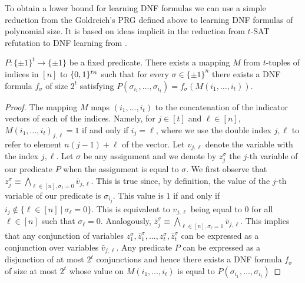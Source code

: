 To obtain a lower bound for learning DNF formulas we can use a simple reduction from the Goldreich's PRG defined above to learning DNF formulas of polynomial size. It is based on ideas implicit in the reduction from $t$-SAT refutation to DNF learning from \cite{DanielyS16}.
\begin{lemma}\label{lem:reduce-dnf}
$P: \{\pm 1\}^t \to \{\pm 1\}$ be a fixed predicate. There exists a mapping $M$ from $t$-tuples of indices in $[n]$ to $\{0, 1\}^{tn}$ such that for every $\sigma \in \{\pm 1 \}^n$ there exists a DNF formula $f_\sigma$ of size $2^t$ satisfying $P(\sigma_{i_1}, \dots, \sigma_{i_t}) = f_\sigma(M(i_1, \dots, i_t))$.
\end{lemma}
\begin{proof}
The mapping $M$ maps $(i_1, \dots, i_t)$ to the concatenation of the indicator vectors of each of the indices. Namely, for $j \in [t]$ and $\ell \in [n]$, $M(i_1, \dots, i_t)_{j,\ell} = 1$ if and only if $i_j = \ell$, where we use the double index $j,\ell$ to refer to element $n (j-1) + \ell$ of the vector. Let $v_{j,\ell}$ denote the variable with the index $j,\ell$. Let $\sigma$ be any assignment and we denote by $z_j^\sigma$ the $j$-th variable of our predicate $P$ when the assignment is equal to $\sigma$. We first observe that $z_j^\sigma \equiv \bigwedge_{\ell \in [n], \sigma_\ell = 0} \bar{v}_{j,\ell}$. This is true since, by definition, the value of the $j$-th variable of our predicate is $\sigma_{i_j}$. This value is $1$ if and only if $i_j \not\in \{\ell \in [n]\ | \ \sigma_\ell = 0\}$. This is equivalent to $v_{j,\ell}$ being equal to $0$ for all $\ell \in [n]$ such that  $\sigma_\ell = 0$. Analogously, $\bar{z}^\sigma_j \equiv \bigwedge_{\ell \in [n], \sigma_\ell = 1} \bar{v}_{j,\ell}$. This implies that any conjunction of variables $z_1^\sigma,\bar{z}^\sigma_1,\ldots,z^\sigma_t,\bar{z}^\sigma_t$ can be expressed as a conjunction over variables $\bar{v}_{j,\ell}$. Any predicate $P$ can be expressed as a disjunction of at most $2^t$ conjunctions and hence there exists a DNF formula $f_\sigma$ of size at most $2^t$ whose value on $M(i_1, \dots, i_t)$ is equal to $P(\sigma_{i_1}, \dots, \sigma_{i_t})$
\end{proof}

